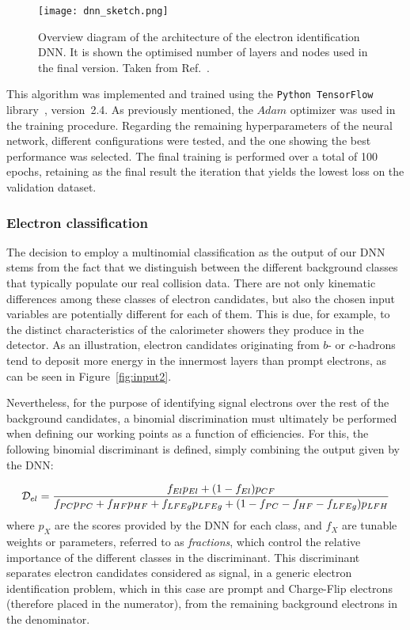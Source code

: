 \begin{figure}[htbp]
  \centering
  \texttt{[image: dnn\_sketch.png]}
  \caption{Overview diagram of the architecture of the electron identification DNN. It is shown the optimised number of layers and nodes used in the final version. Taken from Ref.~\cite{dnn_paper}.}
  \label{dnn_sketch}
\end{figure}

This algorithm was implemented and trained using the \texttt{Python TensorFlow} library~\cite{tensorflow2015}, version~2.4. As previously mentioned, the $Adam$ optimizer was used in the training procedure. Regarding the remaining hyperparameters of the neural network, different configurations were tested, and the one showing the best performance was selected.  
The final training is performed over a total of 100 epochs, retaining as the final result the iteration that yields the lowest loss on the validation dataset.

\subsubsection{Electron classification}

The decision to employ a multinomial classification as the output of our DNN stems from the fact that we distinguish between the different background classes that typically populate our real collision data. There are not only kinematic differences among these classes of electron candidates, but also the chosen input variables are potentially different for each of them. This is due, for example, to the distinct characteristics of the calorimeter showers they produce in the detector. As an illustration, electron candidates originating from $b$- or $c$-hadrons tend to deposit more energy in the innermost layers than prompt electrons, as can be seen in Figure~\ref{fig:input2}.

Nevertheless, for the purpose of identifying signal electrons over the rest of the background candidates, a binomial discrimination must ultimately be performed when defining our working points as a function of efficiencies.  
For this, the following binomial discriminant is defined, simply combining the output given by the DNN:

\begin{equation}
  \small
  \mathcal{D}_{el} = \frac{f_{El}p_{El} + (1-f_{El})p_{CF}}{f_{PC}p_{PC}+f_{HF}p_{HF}+f_{LFEg}p_{LFEg}+(1-f_{PC}-f_{HF}-f_{LFEg})p_{LFH}}
\label{dnn_discriminant}
\end{equation}
where $p_{X}$ are the scores provided by the DNN for each class, and $f_{X}$ are tunable weights or parameters, referred to as \textit{fractions}, which control the relative importance of the different classes in the discriminant.  
This discriminant separates electron candidates considered as signal, in a generic electron identification problem, which in this case are prompt and Charge-Flip electrons (therefore placed in the numerator), from the remaining background electrons in the denominator.

